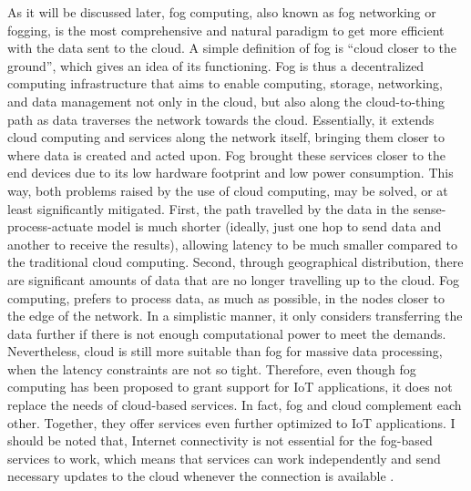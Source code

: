 As it will be discussed later, fog computing, also known as fog networking or fogging, is the most comprehensive and natural paradigm to get more efficient with the data sent to the cloud. A simple definition of fog is ``cloud closer to the ground'', which gives an idea of its functioning. Fog is thus a decentralized computing infrastructure that aims to enable computing, storage, networking, and data management not only in the cloud, but also along the cloud-to-thing path as data traverses the network towards the cloud. Essentially, it extends cloud computing and services along the network itself, bringing them closer to where data is created and acted upon. Fog brought these services closer to the end devices due to its low hardware footprint and low power consumption. This way, both problems raised by the use of cloud computing, may be solved, or at least significantly mitigated. First, the path travelled by the data in the sense-process-actuate model is much shorter (ideally, just one hop to send data and another to receive the results), allowing latency to be much smaller compared to the traditional cloud computing. Second, through geographical distribution, there are significant amounts of data that are no longer travelling up to the cloud. Fog computing, prefers to process data, as much as possible, in the nodes closer to the edge of the network. In a simplistic manner, it only considers transferring the data further if there is not enough computational power to meet the demands.\\ [6pt]
Nevertheless, cloud is still more suitable than fog for massive data processing, when the latency constraints are not so tight. Therefore, even though fog computing has been proposed to grant support for IoT applications, it does not replace the needs of cloud-based services. In fact, fog and cloud complement each other. Together, they offer services even further optimized to IoT applications. I should be noted that, Internet connectivity is not essential for the fog-based services to work, which means that services can work independently and send necessary updates to the cloud whenever the connection is available \cite{yousefpour2018all}.\\ [6pt]
